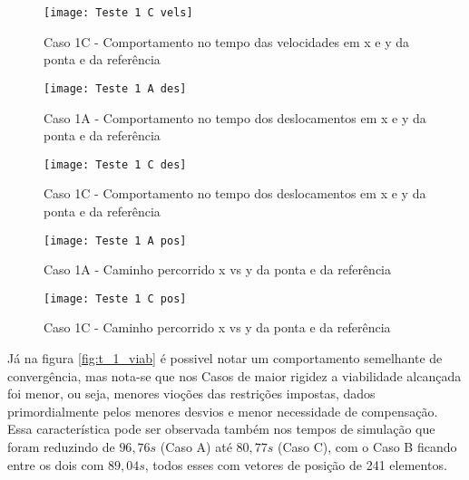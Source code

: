 \begin{figure}[!htb]
    \begin{center}
    \caption{Caso 1C - Comportamento no tempo das velocidades em x e y da ponta e da referência}
    \texttt{[image: Teste 1 C vels]}
    \label{fig:t_1c_vels}
    \end{center}
\end{figure}

\begin{figure}[!htb]
    \begin{center}
    \caption{Caso 1A - Comportamento no tempo dos deslocamentos em x e y da ponta e da referência}
    \texttt{[image: Teste 1 A des]}
    \label{fig:t_1a_des}
    \end{center}
\end{figure}

\begin{figure}[!htb]
    \begin{center}
    \caption{Caso 1C - Comportamento no tempo dos deslocamentos em x e y da ponta e da referência}
    \texttt{[image: Teste 1 C des]}
    \label{fig:t_1c_des}
    \end{center}
\end{figure}

\begin{figure}[!htb]
    \begin{center}
    \caption{Caso 1A - Caminho percorrido x vs y da ponta e da referência}
    \texttt{[image: Teste 1 A pos]}
    \label{fig:t_1a_pos}
    \end{center}
\end{figure}

\begin{figure}[!htb]
    \begin{center}
    \caption{Caso 1C - Caminho percorrido x vs y da ponta e da referência}
    \texttt{[image: Teste 1 C pos]}
    \label{fig:t_1c_pos}
    \end{center}
\end{figure}

Já na figura \ref{fig:t_1_viab} é possivel notar um comportamento semelhante de convergência, mas nota-se que
nos Casos de maior rigidez a viabilidade alcançada foi menor, ou seja, menores vioções das restrições impostas, dados
primordialmente pelos menores desvios e menor necessidade de compensação.
Essa característica pode ser observada também nos tempos de simulação que foram reduzindo de $96,76 s$ (Caso A) até
$80,77 s$ (Caso C), com o Caso B ficando entre os dois com $89,04 s$, todos esses com vetores de posição de 241 elementos.

